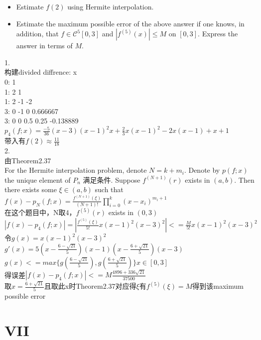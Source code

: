 \documentclass[a4paper]{article}
\begin{document}
\begin{itemize}
    \item Estimate $f(2)$ using Hermite interpolation.
    \item Estimate the maximum possible error of the above answer if one knows, in addition, that $f\in\mathcal{C}^{5}[0,3]$ and $|f^{(5)}(x)|\leq M$ on $[0,3]$. Express the answer in terms of $M$.
\end{itemize}
1.\\
构建divided diffrence:
x\\
0: 1\\
1: 2 1\\
1: 2 -1 -2\\
3: 0 -1 0   0.666667\\
3: 0 0  0.5 0.25 -0.138889\\
$p_4(f;x)=\frac{-5}{36}(x-3)(x-1)^2x+\frac{2}{3}x(x-1)^2-2x(x-1)+x+1$\\
带入有$f(2)\approx\frac{11}{18}$\\
2.\\
由Theorem2.37\\
For the Hermite interpolation problem, denote \( N = k + m_i \). Denote by \( p(f; x) \) the unique element of \( P_n \)  满足条件. Suppose \( f^{(N+1)}(r) \) exists in \((a,b)\). Then there exists some \( \xi \in (a,b) \) such that\\
$f(x) - p_N(f; x) = \frac{f^{(N+1)}(\xi)}{(N+1)!} \prod_{i=0}^k (x - x_i)^{m_i + 1}$\\
在这个题目中，N取4，\( f^{(5)}(r) \) exists in \((0,3)\)\\
$|f(x) - p_4(f; x)| = |\frac{f^{(5)}(\xi)}{5!}x (x - 1)^2(x-3)^2|<=\frac{M}{5!}x (x - 1)^2(x-3)^2$\\
令$g(x)=x (x - 1)^2(x-3)^2$\\
$g'(x)=5(x-\frac{6-\sqrt{21}}{5})(x-1)(x-\frac{6+\sqrt{21}}{5})(x-3)$\\
$g(x)<=max\{g(\frac{6-\sqrt{21}}{5}),g(\frac{6+\sqrt{21}}{5})\} x\in[0,3]$\\
得误差$|f(x) - p_4(f; x)|<=M\frac{4896+336\sqrt{21}}{37500}$\\
取$x=\frac{6+\sqrt{21}}{5}$且取此x时Theorem2.37对应得$\xi$有$f^{(5)}(\xi)=M$得到该maximum possible error\\



\section*{VII}
\end{document}
